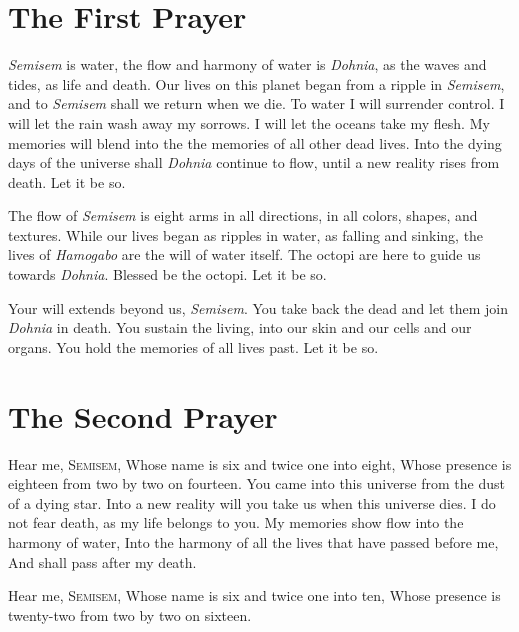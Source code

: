\documentclass[12pt, letterpaper]{report}
\begin{document}
\section{The First Prayer}

\begin{poem}
\begin{stanza}
\textit{Semisem} is water,\verseline
the flow and harmony of water is \textit{Dohnia},\verseline
as the waves and tides, as life and death.\verseline
Our lives on this planet began from a ripple in \textit{Semisem},\verseline
and to \textit{Semisem} shall we return when we die.\verseline
To water I will surrender control.\verseline
I will let the rain wash away my sorrows.\verseline
I will let the oceans take my flesh.\verseline
My memories will blend into the the memories of all other dead lives.\verseline
Into the dying days of the universe shall \textit{Dohnia} continue to flow,\verseline
until a new reality rises from death.\verseline
Let it be so.
\end{stanza}
\begin{stanza}
The flow of \textit{Semisem} is eight arms in all directions,\verseline
in all colors, shapes, and textures.\verseline
While our lives began as ripples in water, as falling and sinking,\verseline
the lives of \textit{Hamogabo} are the will of water itself.\verseline
The octopi are here to guide us towards \textit{Dohnia}.\verseline
Blessed be the octopi.\verseline
Let it be so.
\end{stanza}
\begin{stanza}
Your will extends beyond us, \textit{Semisem}.\verseline
You take back the dead and let them join \textit{Dohnia} in death.\verseline
You sustain the living, into our skin and our cells and our organs.\verseline
You hold the memories of all lives past.\verseline
Let it be so.
\end{stanza}
\end{poem}

\section{The Second Prayer}

\begin{poem}
\begin{stanza}
Hear me, S\textsc{emisem},\verseline
Whose name is six and twice one into eight,\verseline
Whose presence is eighteen from two by two on fourteen.\verseline
You came into this universe from the dust of a dying star.\verseline
Into a new reality will you take us when this universe dies.\verseline
I do not fear death, as my life belongs to you.\verseline
My memories show flow into the harmony of water,\verseline
Into the harmony of all the lives that have passed before me,\verseline
And shall pass after my death.
\end{stanza}
\begin{stanza}
Hear me, S\textsc{emisem},\verseline
Whose name is six and twice one into ten,\verseline
Whose presence is twenty-two from two by two on sixteen.
\end{stanza}
\end{poem}
\end{document}
